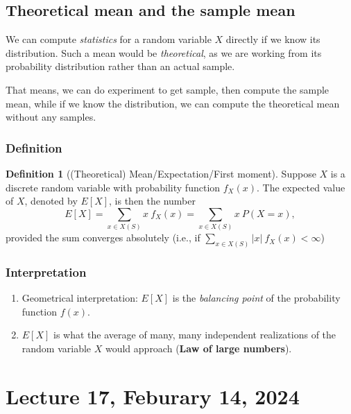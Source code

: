 \documentclass[
]{book}
\providecommand{\tightlist}{%
  \setlength{\itemsep}{0pt}\setlength{\parskip}{0pt}}
\theoremstyle{definition}
\newtheorem{definition}{Definition}[chapter]
\theoremstyle{definition}
\theoremstyle{definition}
\theoremstyle{definition}
\theoremstyle{remark}
\begin{document}
\hypertarget{theoretical-mean-and-the-sample-mean}{%
\section{Theoretical mean and the sample mean}\label{theoretical-mean-and-the-sample-mean}}

We can compute \emph{statistics} for a random variable \(X\) directly if we know its distribution. Such a mean would be \emph{theoretical}, as we are working from its probability distribution rather than an actual sample.

That means, we can do experiment to get sample, then compute the sample mean, while if we know the distribution, we can compute the theoretical mean without any samples.

\hypertarget{definition}{%
\subsection{Definition}\label{definition}}

\begin{definition}[(Theoretical) Mean/Expectation/First moment]
Suppose \(X\) is a discrete random variable with probability function \(f_X(x)\). The expected value of \(X\), denoted by \(E[X]\), is then the number
\[
E[X] = \sum_{x\in X(S) } x \ f_X(x) = \sum_{x\in X(S) } x \ P(X=x),
\]
provided the sum converges absolutely (i.e., if \(\sum_{x\in X(S) } |x| \ f_X(x)<\infty\))
\end{definition}

\hypertarget{interpretation}{%
\subsection{Interpretation}\label{interpretation}}

\begin{enumerate}
\def\labelenumi{\arabic{enumi}.}
\tightlist
\item
  Geometrical interpretation: \(E[X]\) is the \emph{balancing point} of the probability function \(f(x)\).
\item
  \(E[X]\) is what the average of many, many independent realizations of the random variable \(X\) would approach (\textbf{Law of large numbers}).
\end{enumerate}

\hypertarget{lecture-17-feburary-14-2024}{%
\chapter{Lecture 17, Feburary 14, 2024}\label{lecture-17-feburary-14-2024}}
\end{document}
